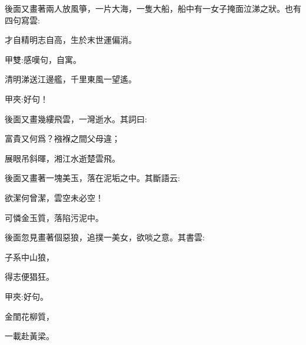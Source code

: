 \begin{parag}
    後面又畫著兩人放風箏，一片大海，一隻大船，船中有一女子掩面泣涕之狀。也有四句寫雲:
\end{parag}


\begin{poem}
    \begin{pl}才自精明志自高，生於末世運偏消。\end{pl}
    \begin{note}甲雙:感嘆句，自寓。\end{note}

    \begin{pl}清明涕送江邊艦，千里東風一望遙。\end{pl}
    \begin{note}甲夾:好句！\end{note}
\end{poem}


\begin{parag}
    後面又畫幾縷飛雲，一灣逝水。其詞曰:
\end{parag}


\begin{poem}
    \begin{pl}富貴又何爲？襁褓之間父母違；\end{pl}

    \begin{pl}展眼吊斜暉，湘江水逝楚雲飛。\end{pl}

\end{poem}


\begin{parag}
    後面又畫著一塊美玉，落在泥垢之中。其斷語云:
\end{parag}


\begin{poem}
    \begin{pl}欲潔何曾潔，雲空未必空！\end{pl}

    \begin{pl}可憐金玉質，落陷污泥中。\end{pl}
\end{poem}


\begin{parag}
    後面忽見畫著個惡狼，追撲一美女，欲啖之意。其書雲:
\end{parag}


\begin{poem}
    \begin{pl}子系中山狼，\end{pl}

    \begin{pl}得志便猖狂。\end{pl}\begin{note}甲夾:好句。\end{note}

    \begin{pl}金閨花柳質，\end{pl}

    \begin{pl}一載赴黃梁。\end{pl}

\end{poem}


